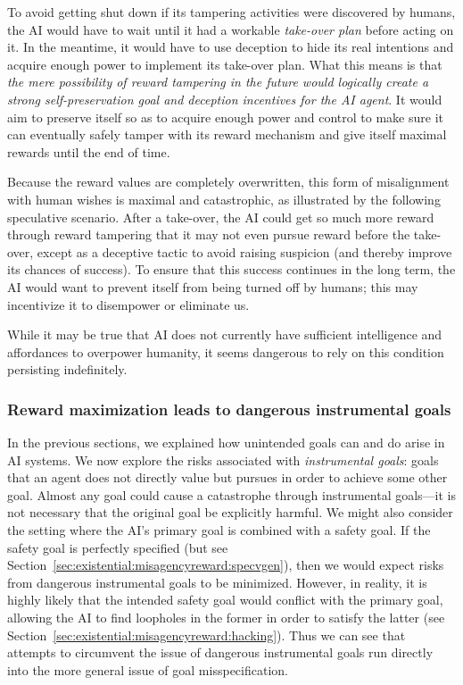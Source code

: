 To avoid getting shut down if its tampering activities were discovered by humans, the AI would have to wait until it had a workable \emph{take-over plan} before acting on it. In the meantime, it would have to use deception to hide its real intentions and acquire enough power to implement its take-over plan. What this means is that \emph{the mere possibility of reward tampering in the future would logically create a strong self-preservation goal and deception incentives for the AI agent}. It would aim to preserve itself so as to acquire enough power and control to make sure it can eventually safely tamper with its reward mechanism and give itself maximal rewards until the end of time.

Because the reward values are completely overwritten, this form of misalignment with human wishes is maximal and catastrophic, as illustrated by the following speculative scenario. After a take-over, the AI could get so much more reward through reward tampering that it may not even pursue reward before the take-over, except as a deceptive tactic to avoid raising suspicion (and thereby improve its chances of success). To ensure that this success continues in the long term, the AI would want to prevent itself from being turned off by humans; this may incentivize it to disempower or eliminate us.

While it may be true that AI does not currently have sufficient intelligence and affordances to overpower humanity, it seems dangerous to rely on this condition persisting indefinitely.

    \subsubsection{Reward maximization leads to dangerous instrumental goals}
    \label{sec:existential:misagencyreward:goals}

In the previous sections, we explained how unintended goals can and do arise in AI systems. We now explore the risks associated with \textit{instrumental goals}: goals that an agent does not directly value but pursues in order to achieve some other goal. Almost any goal could cause a catastrophe through instrumental goals---it is not necessary that the original goal be explicitly harmful. We might also consider the setting where the AI's primary goal is combined with a safety goal. If the safety goal is perfectly specified (but see Section~\ref{sec:existential:misagencyreward:specvgen}), then we would expect risks from dangerous instrumental goals to be minimized. However, in reality, it is highly likely that the intended safety goal would conflict with the primary goal, allowing the AI to find loopholes in the former in order to satisfy the latter (see Section~\ref{sec:existential:misagencyreward:hacking}). Thus we can see that attempts to circumvent the issue of dangerous instrumental goals run directly into the more general issue of goal misspecification.

